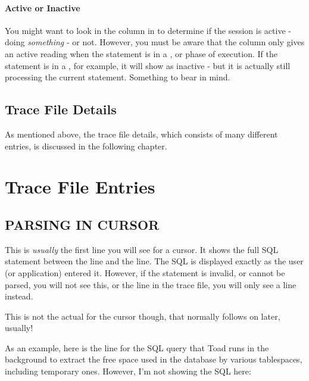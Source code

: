 \subsubsection{Active or Inactive}\label{active-or-inactive}

You might want to look in the  column in  to determine if the session is active - doing \emph{something} - or not. However, you must be aware that the  column only gives an active reading when the statement is in a ,  or  phase of execution. If the statement is in a , for example, it will show as inactive - but it is actually still processing the current statement. Something to bear in mind.

\section{Trace File Details}\label{trace-file-details}

As mentioned above, the trace file details, which consists of many different entries, is discussed in the following chapter.

\chapter{Trace File Entries}

\section{PARSING IN CURSOR}\label{parsing-in-cursor}

This is \emph{usually} the first line you will see for a cursor. It shows the full SQL statement between the  line and the  line. The SQL is displayed exactly as the user (or application) entered it. However, if the statement is invalid, or cannot be parsed, you will not see this, or the  line in the trace file, you will only see a  line instead.

This is not the actual  for the cursor though, that normally follows on later, usually!

As an example, here is the  line for the SQL query that Toad runs in the background to extract the free space used in the database by various tablespaces, including temporary ones. However, I'm not showing the SQL here:

